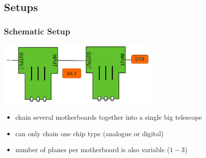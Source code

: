 \documentclass[9pt]{beamer}
\begin{document}
\subsection{Setups}
\begin{frame}
	\frametitle{Schematic Setup}
	\begin{center}
		\includegraphics[width=8cm]{Modul}
	\end{center}
	\begin{itemize}
		\item chain several motherboards together into a single big telescope
		\item can only chain one chip type (analogue or digital)
		\item number of planes per motherboard is also variable ($1-3$)
	\end{itemize}
\end{frame}
\end{document}
